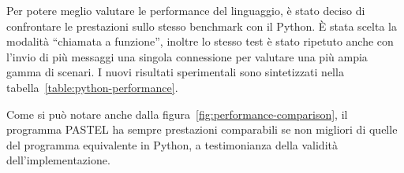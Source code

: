 \documentclass[10pt]{article}
\begin{document}
\begin{table}[htbp]
	\centering
	\caption{Tempo necessario per l'invio di un numero crescente di messaggi in Python, e in PASTEL con connessione singola}
	\label{table:python-performance}
\end{table}

Per potere meglio valutare le performance del linguaggio, è stato deciso di confrontare le prestazioni sullo stesso benchmark con il Python. È stata scelta la modalità ``chiamata a funzione'', inoltre lo stesso test è stato ripetuto anche con l'invio di più messaggi una singola connessione per valutare una più ampia gamma di scenari. I nuovi risultati sperimentali sono sintetizzati nella tabella~\ref{table:python-performance}.

Come si può notare anche dalla figura~\ref{fig:performance-comparison}, il programma PASTEL ha sempre prestazioni comparabili se non migliori di quelle del programma equivalente in Python, a testimonianza della validità dell'implementazione.
\end{document}
